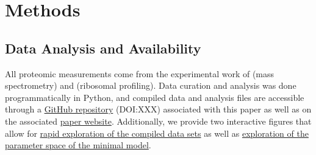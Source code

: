 \section{Methods}

\subsection{Data Analysis and Availability}
All proteomic measurements come from the experimental work of \cite{schmidt2016,
peebo2015, valgepea2013} (mass spectrometry) and \cite{li2014} (ribosomal
profiling). Data curation and analysis was done programmatically in Python, and
compiled data and analysis files are accessible through a
\href{https://github.com/rpgroup-pboc/growth_limits}{GitHub repository}
(DOI:XXX) associated with this paper as well as on the associated
\href{https://rpgroup.caltech.edu/growth_limits}{paper website}. Additionally,
we provide two interactive figures that allow for
\href{https://rpgroup.caltech.edu/growth_limits}{rapid exploration of the
compiled data sets} as well as
\href{https://rpgroup.caltech.edu/growth_limits}{exploration of the parameter
space of the minimal model}. 


